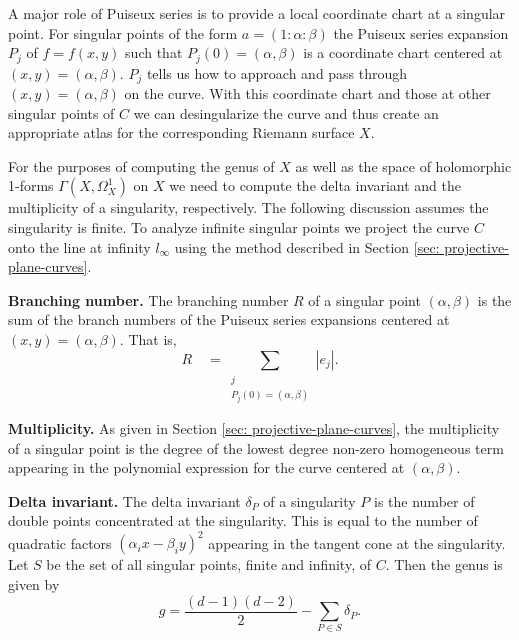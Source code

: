A major role of Puiseux series is to provide a local coordinate chart at a
singular point. For singular points of the form $a = (1 : \alpha : \beta)$ the
Puiseux series expansion $P_j$ of $f = f(x,y)$ such that $P_j(0) = (\alpha,
\beta)$ is a coordinate chart centered at $(x,y) = (\alpha, \beta)$. $P_j$ tells
us how to approach and pass through $(x,y) = (\alpha, \beta)$ on the curve. With
this coordinate chart and those at other singular points of $C$ we can
desingularize the curve and thus create an appropriate atlas for the
corresponding Riemann surface $X$.

For the purposes of computing the genus of $X$ as well as the space of
holomorphic 1-forms $\Gamma(X,\Omega_X^1)$ on $X$ we need to compute the delta
invariant and the multiplicity of a singularity, respectively. The following
discussion assumes the singularity is finite. To analyze infinite singular
points we project the curve $C$ onto the line at infinity $l_\infty$ using the
method described in Section \ref{sec: projective-plane-curves}.

{\bf Branching number.} The branching number $R$ of a singular point
$(\alpha,\beta)$ is the sum of the branch numbers of the Puiseux series
expansions centered at $(x,y) = (\alpha,\beta)$. That is,
\[
  R \quad = \sum_{\substack{j \\ P_j(0)=(\alpha,\beta)}} |e_j|.
\]

{\bf Multiplicity.} As given in Section \ref{sec: projective-plane-curves}, the
multiplicity of a singular point is the degree of the lowest degree non-zero
homogeneous term appearing in the polynomial expression for the curve centered
at $(\alpha, \beta)$.

{\bf Delta invariant.} The delta invariant $\delta_P$ of a singularity $P$ is
the number of double points concentrated at the singularity. This is equal to
the number of quadratic factors $(\alpha_i x - \beta_i y)^2$ appearing in the
tangent cone at the singularity. Let $S$ be the set of all singular points,
finite and infinity, of $C$. Then the genus is given by
\begin{equation} \label{eqn: genus-formula}
  g = \frac{(d-1)(d-2)}{2} - \sum_{P \in S} \delta_P.
\end{equation}

